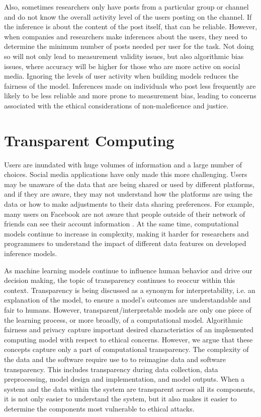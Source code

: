 \documentclass[11pt]{article} %
\begin{document}
Also, sometimes researchers only have posts from a particular group or channel and do not know the overall activity level of the users posting on the channel. If the inference is about the content of the post itself, that can be reliable. However, when companies and researchers make inferences about the users, they need to determine the minimum number of posts needed per user for the task. Not doing so will not only lead to measurement validity issues, but also algorithmic bias issues, where accuracy will be higher for those who are more active on social media. Ignoring the levels of user activity when building models reduces the fairness of the model. Inferences made on individuals who post less frequently are likely to be less reliable and more prone to measurement bias, leading to concerns associated with the ethical considerations of non-maleficence and justice.

\section{Transparent Computing}
\label{sec:transparency}
Users are inundated with huge volumes of information and a large number of choices. Social media applications have only made this more challenging. Users may be unaware of the data that are being shared or used by different platforms, and if they are aware, they may not understand how the platforms are using the data or how to make adjustments to their data sharing preferences. For example, many users on Facebook are not aware that people outside of their network of friends can see their account information \cite{orito_2014,FB_targetad}.
At the same time, computational models continue to increase in complexity, making it harder for researchers and programmers to understand the impact of different data features on developed inference models. 

As machine learning models continue to influence human behavior and drive our decision making, the topic of transparency continues to reoccur within this context. Transparency is being discussed as a synonym for interpretability, i.e. an explanation of the model, to ensure a model's outcomes are understandable and fair to humans. However, transparent/interpretable models are only one piece of the learning process, or more broadly, of a computational model. Algorithmic fairness and privacy capture important desired characteristics of an implemented computing model with respect to ethical concerns. However, we argue that these concepts capture only a part of computational transparency. The complexity of the data and the software require use to to reimagine data and software transparency. This includes transparency during data collection, data preprocessing, model design and implementation, and model outputs.  When a system and the data within the system are transparent across all its components, it is not only easier to understand the system, but it also makes it easier to determine the components most vulnerable to ethical attacks. 
\end{document}
